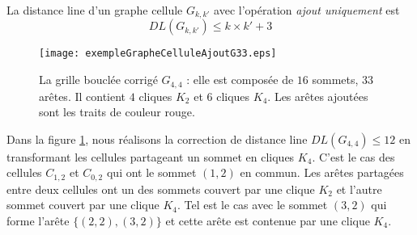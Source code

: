 \begin{lemma}
La distance line d'un graphe cellule $G_{k,k'}$ avec l'op\'eration  {\em ajout uniquement} est 
\begin{equation}
DL(G_{k,k'}) \le k \times k' +3 
\end{equation}
\end{lemma}

\begin{figure}[htb!] 
\centering
\texttt{[image: exempleGrapheCelluleAjoutG33.eps]}
\caption{ La grille boucl\'ee  corrig\'e $G_{4,4}$ : elle est compos\'ee de $16$ sommets, $33$ ar\^etes. Il contient $4$ cliques $K_{2}$ et $6$ cliques $K_4$. Les ar\^etes ajout\'ees sont les traits de couleur rouge.}
\label{exempleCorrectionGrapheCelluleAvecAjout}
\end{figure}
Dans la figure \ref{exempleCorrectionGrapheCelluleAvecAjout}, nous r\'ealisons la correction de distance line $DL(G_{4,4})  \le 12$ en transformant les cellules partageant un sommet en cliques $K_4$. C'est le cas des cellules $C_{1,2}$ et  $C_{0,2}$ qui ont le sommet $(1,2)$ en commun. 
Les ar\^etes partag\'ees entre deux cellules ont un des sommets couvert par une clique $K_2$ et l'autre sommet couvert par une clique $K_4$. Tel est le cas avec le sommet $(3,2)$ qui forme l'ar\^ete $\{(2,2),(3,2)\}$ et cette ar\^ete est contenue par une clique $K_4$.




